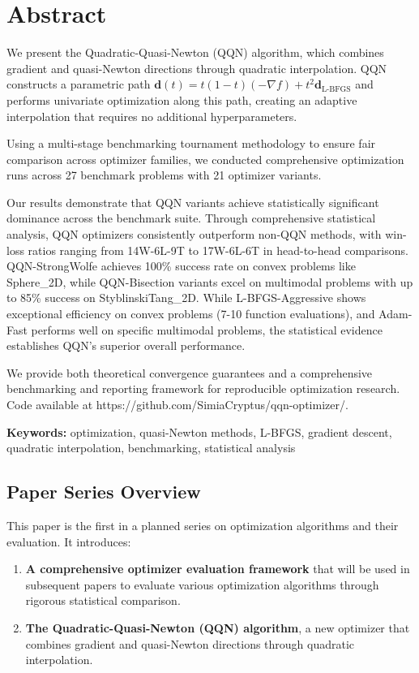 \hypertarget{abstract}{%
\section{Abstract}\label{abstract}}

We present the Quadratic-Quasi-Newton (QQN) algorithm, which combines gradient and quasi-Newton directions through quadratic interpolation.
QQN constructs a parametric path \(\mathbf{d}(t) = t(1-t)(-\nabla f) + t^2 \mathbf{d}_{\text{L-BFGS}}\) and performs univariate optimization along this path, creating an adaptive interpolation that requires no additional hyperparameters.

Using a multi-stage benchmarking tournament methodology to ensure fair comparison across optimizer families, we conducted comprehensive optimization runs across 27 benchmark problems with 21 optimizer variants.

Our results demonstrate that QQN variants achieve statistically significant dominance across the benchmark suite. Through comprehensive statistical analysis, QQN optimizers consistently outperform non-QQN methods, with win-loss ratios ranging from 14W-6L-9T to 17W-6L-6T in head-to-head comparisons. QQN-StrongWolfe achieves 100\% success rate on convex problems like Sphere\_2D, while QQN-Bisection variants excel on multimodal problems with up to 85\% success on StyblinskiTang\_2D. While L-BFGS-Aggressive shows exceptional efficiency on convex problems (7-10 function evaluations), and Adam-Fast performs well on specific multimodal problems, the statistical evidence establishes QQN's superior overall performance.

We provide both theoretical convergence guarantees and a comprehensive benchmarking and reporting framework for reproducible optimization research.
Code available at https://github.com/SimiaCryptus/qqn-optimizer/.

\textbf{Keywords:} optimization, quasi-Newton methods, L-BFGS, gradient descent, quadratic interpolation, benchmarking, statistical analysis

\hypertarget{paper-series-overview}{%
\subsection{Paper Series Overview}\label{paper-series-overview}}

This paper is the first in a planned series on optimization algorithms and their evaluation. It introduces:

\begin{enumerate}
\def\labelenumi{\arabic{enumi}.}
\tightlist
\item
  \textbf{A comprehensive optimizer evaluation framework} that will be used in subsequent papers to evaluate various optimization algorithms through rigorous statistical comparison.
\item
  \textbf{The Quadratic-Quasi-Newton (QQN) algorithm}, a new optimizer that combines gradient and quasi-Newton directions through quadratic interpolation.
\end{enumerate}

